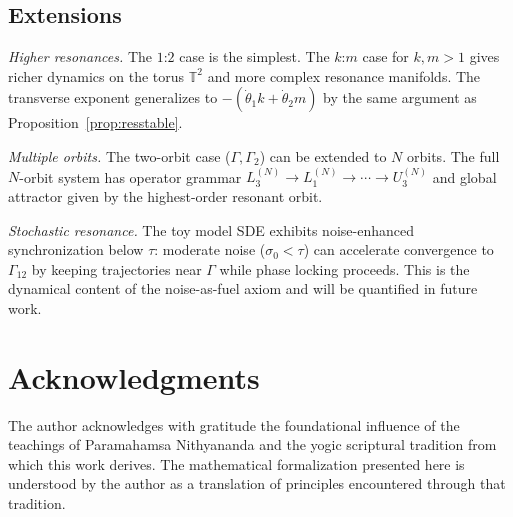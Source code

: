 \documentclass[12pt, oneside]{book}
\theoremstyle{plain}
\theoremstyle{definition}
\theoremstyle{remark}
\newcommand{\T}{\mathbb{T}}
\newcommand{\Orb}{\Gamma}
\begin{document}
\subsection{Extensions}

\emph{Higher resonances.} The $1$:$2$ case is the simplest. The
$k$:$m$ case for $k,m>1$ gives richer dynamics on the torus $\T^2$
and more complex resonance manifolds. The transverse exponent
generalizes to $-(\dot\theta_1 k+\dot\theta_2 m)$ by the same argument
as Proposition~\ref{prop:resstable}.

\emph{Multiple orbits.} The two-orbit case ($\Orb,\Orb_2$) can be
extended to $N$ orbits. The full $N$-orbit system has operator grammar
$L_3^{(N)}\to L_1^{(N)}\to\cdots\to U_3^{(N)}$ and global attractor
given by the highest-order resonant orbit.

\emph{Stochastic resonance.} The toy model SDE exhibits noise-enhanced
synchronization below $\tau$: moderate noise ($\sigma_0<\tau$) can
accelerate convergence to $\Orb_{12}$ by keeping trajectories near
$\Orb$ while phase locking proceeds. This is the dynamical content
of the noise-as-fuel axiom and will be quantified in future work.

\section*{Acknowledgments}
The author acknowledges with gratitude the foundational influence
of the teachings of Paramahamsa Nithyananda and the yogic
scriptural tradition from which this work derives. The mathematical
formalization presented here is understood by the author as a
translation of principles encountered through that tradition.
\end{document}
